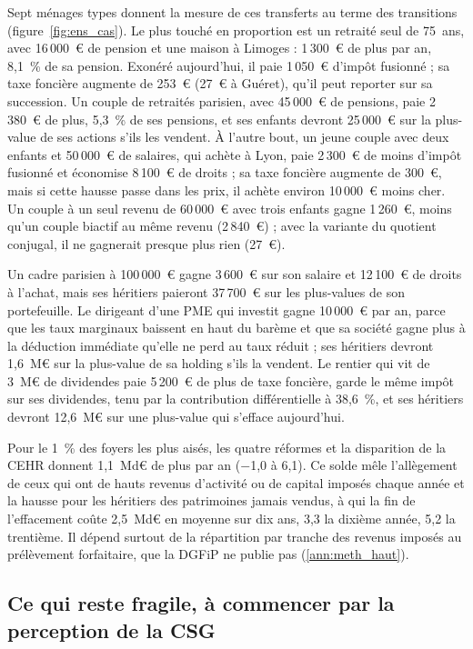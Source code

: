 \documentclass[11pt,a4paper]{article}
\begin{document}
Sept ménages types donnent la mesure de ces transferts au terme des transitions (figure~\ref{fig:ens_cas}). Le plus
touché en proportion est un retraité seul de 75~ans, avec 16\,000~€ de pension et une maison à Limoges : 1\,300~€ de
plus par an, 8,1~\% de sa pension. Exonéré aujourd'hui, il paie 1\,050~€ d'impôt fusionné ; sa taxe foncière augmente de
253~€ (27~€ à Guéret), qu'il peut reporter sur sa succession. Un couple de retraités parisien, avec 45\,000~€ de
pensions, paie 2\,380~€ de plus, 5,3~\% de ses pensions, et ses enfants devront 25\,000~€ sur la plus-value de ses
actions s'ils les vendent. À l'autre bout, un jeune couple avec deux enfants et 50\,000~€ de salaires, qui achète à
Lyon, paie 2\,300~€ de moins d'impôt fusionné et économise 8\,100~€ de droits ; sa taxe foncière augmente de 300~€, mais
si cette hausse passe dans les prix, il achète environ 10\,000~€ moins cher. Un couple à un seul revenu de 60\,000~€
avec trois enfants gagne 1\,260~€, moins qu'un couple biactif au même revenu (2\,840~€) ; avec la variante du quotient
conjugal, il ne gagnerait presque plus rien (27~€).

Un cadre parisien à 100\,000~€ gagne 3\,600~€ sur son salaire et 12\,100~€ de droits à l'achat, mais ses héritiers
paieront 37\,700~€ sur les plus-values de son portefeuille. Le dirigeant d'une PME qui investit gagne 10\,000~€ par
an, parce que les taux marginaux baissent en haut du barème et que sa société gagne plus à la déduction immédiate
qu'elle ne perd au taux réduit ; ses héritiers devront 1,6~M€ sur la plus-value de sa holding s'ils la vendent. Le
rentier qui vit de 3~M€ de dividendes paie 5\,200~€ de plus de taxe foncière, garde le même impôt sur ses dividendes,
tenu par la contribution différentielle à 38,6~\%, et ses héritiers devront 12,6~M€ sur une plus-value qui s'efface
aujourd'hui.

Pour le 1~\% des foyers les plus aisés, les quatre réformes et la disparition de la CEHR donnent 1,1~Md€ de plus par
an ($-$1,0 à 6,1). Ce solde mêle l'allègement de ceux qui ont de hauts revenus d'activité ou de capital imposés chaque
année et la hausse pour les héritiers des patrimoines jamais vendus, à qui la fin de l'effacement coûte 2,5~Md€ en
moyenne sur dix ans, 3,3 la dixième année, 5,2 la trentième. Il dépend surtout de la répartition par tranche des
revenus imposés au prélèvement forfaitaire, que la DGFiP ne publie pas (\ref{ann:meth_haut}).

\subsection{Ce qui reste fragile, à commencer par la perception de la CSG}\label{sec:ens_fragile}
\end{document}
